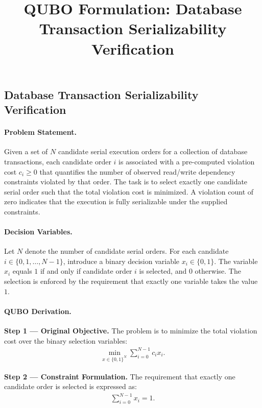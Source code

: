 \documentclass[12pt]{article}
\title{QUBO Formulation: Database Transaction Serializability Verification}
\date{}
\begin{document}
\maketitle

\subsection*{Database Transaction Serializability Verification}

\paragraph{Problem Statement.}
Given a set of $N$ candidate serial execution orders for a collection of database transactions, each candidate order $i$ is associated with a pre-computed violation cost $c_i \ge 0$ that quantifies the number of observed read/write dependency constraints violated by that order. The task is to select exactly one candidate serial order such that the total violation cost is minimized. A violation count of zero indicates that the execution is fully serializable under the supplied constraints.

\paragraph{Decision Variables.}
Let $N$ denote the number of candidate serial orders. For each candidate $i \in \{0, 1, \dots, N-1\}$, introduce a binary decision variable $x_i \in \{0,1\}$. The variable $x_i$ equals $1$ if and only if candidate order $i$ is selected, and $0$ otherwise. The selection is enforced by the requirement that exactly one variable takes the value $1$.

\paragraph{QUBO Derivation.}
\textbf{Step 1 --- Original Objective.} The problem is to minimize the total violation cost over the binary selection variables:
\begin{align}
\min_{x \in \{0,1\}^N} \sum_{i=0}^{N-1} c_i x_i.
\end{align}

\textbf{Step 2 --- Constraint Formulation.} The requirement that exactly one candidate order is selected is expressed as:
\begin{align}
\sum_{i=0}^{N-1} x_i = 1.
\end{align}
\end{document}
